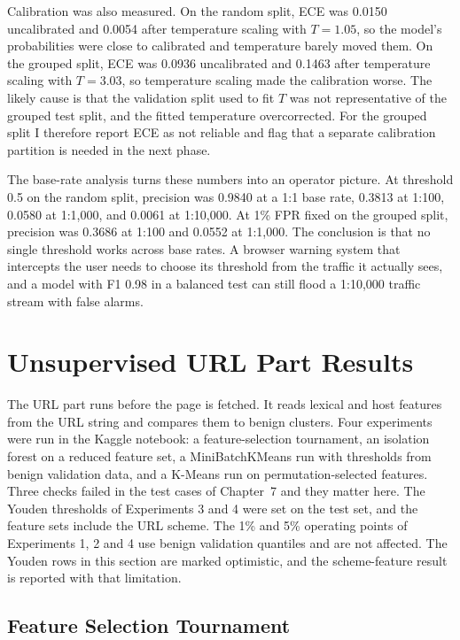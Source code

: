 \documentclass{FastFyp}
\begin{document}
Calibration was also measured. On the random split, ECE was 0.0150 uncalibrated and 0.0054 after temperature scaling with $T=1.05$, so the model's probabilities were close to calibrated and temperature barely moved them. On the grouped split, ECE was 0.0936 uncalibrated and 0.1463 after temperature scaling with $T=3.03$, so temperature scaling made the calibration worse. The likely cause is that the validation split used to fit $T$ was not representative of the grouped test split, and the fitted temperature overcorrected. For the grouped split I therefore report ECE as not reliable and flag that a separate calibration partition is needed in the next phase.

The base-rate analysis turns these numbers into an operator picture. At threshold 0.5 on the random split, precision was 0.9840 at a 1:1 base rate, 0.3813 at 1:100, 0.0580 at 1:1{,}000, and 0.0061 at 1:10{,}000. At 1\% FPR fixed on the grouped split, precision was 0.3686 at 1:100 and 0.0552 at 1:1{,}000. The conclusion is that no single threshold works across base rates. A browser warning system that intercepts the user needs to choose its threshold from the traffic it actually sees, and a model with F1 0.98 in a balanced test can still flood a 1:10{,}000 traffic stream with false alarms.

\section{Unsupervised URL Part Results}
\label{sec:url-results}

The URL part runs before the page is fetched. It reads lexical and host features from the URL string and compares them to benign clusters. Four experiments were run in the Kaggle notebook: a feature-selection tournament, an isolation forest on a reduced feature set, a MiniBatchKMeans run with thresholds from benign validation data, and a K-Means run on permutation-selected features. Three checks failed in the test cases of Chapter~7 and they matter here. The Youden thresholds of Experiments 3 and 4 were set on the test set, and the feature sets include the URL scheme. The 1\% and 5\% operating points of Experiments 1, 2 and 4 use benign validation quantiles and are not affected. The Youden rows in this section are marked optimistic, and the scheme-feature result is reported with that limitation.

\subsection{Feature Selection Tournament}
\label{subsec:url-fs}
\end{document}

